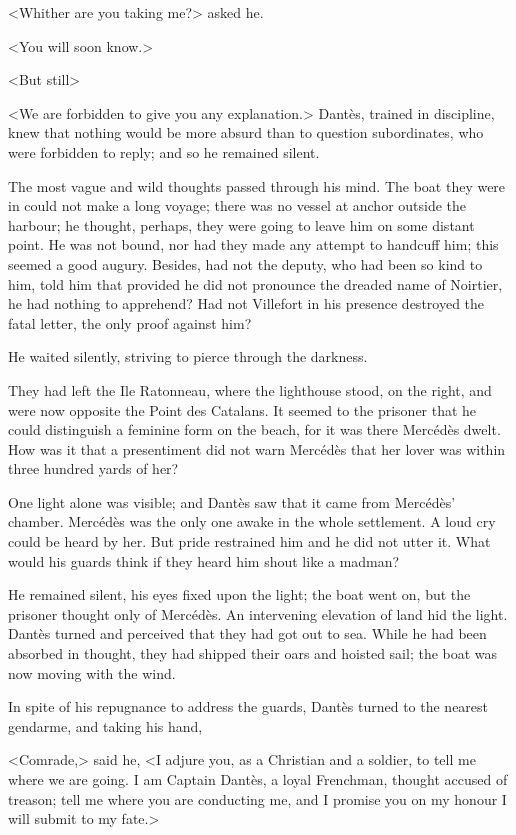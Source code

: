  <Whither are you taking me?> asked he. 

 <You will soon know.> 

 <But still\longdash> 

 <We are forbidden to give you any explanation.> Dantès, trained in discipline, knew that nothing would be more absurd than to question subordinates, who were forbidden to reply; and so he remained silent. 

 The most vague and wild thoughts passed through his mind. The boat they were in could not make a long voyage; there was no vessel at anchor outside the harbour; he thought, perhaps, they were going to leave him on some distant point. He was not bound, nor had they made any attempt to handcuff him; this seemed a good augury. Besides, had not the deputy, who had been so kind to him, told him that provided he did not pronounce the dreaded name of Noirtier, he had nothing to apprehend? Had not Villefort in his presence destroyed the fatal letter, the only proof against him? 

 He waited silently, striving to pierce through the darkness. 

 They had left the Ile Ratonneau, where the lighthouse stood, on the right, and were now opposite the Point des Catalans. It seemed to the prisoner that he could distinguish a feminine form on the beach, for it was there Mercédès dwelt. How was it that a presentiment did not warn Mercédès that her lover was within three hundred yards of her? 

 One light alone was visible; and Dantès saw that it came from Mercédès' chamber. Mercédès was the only one awake in the whole settlement. A loud cry could be heard by her. But pride restrained him and he did not utter it. What would his guards think if they heard him shout like a madman? 

 He remained silent, his eyes fixed upon the light; the boat went on, but the prisoner thought only of Mercédès. An intervening elevation of land hid the light. Dantès turned and perceived that they had got out to sea. While he had been absorbed in thought, they had shipped their oars and hoisted sail; the boat was now moving with the wind. 

 In spite of his repugnance to address the guards, Dantès turned to the nearest gendarme, and taking his hand, 

 <Comrade,> said he, <I adjure you, as a Christian and a soldier, to tell me where we are going. I am Captain Dantès, a loyal Frenchman, thought accused of treason; tell me where you are conducting me, and I promise you on my honour I will submit to my fate.> 

